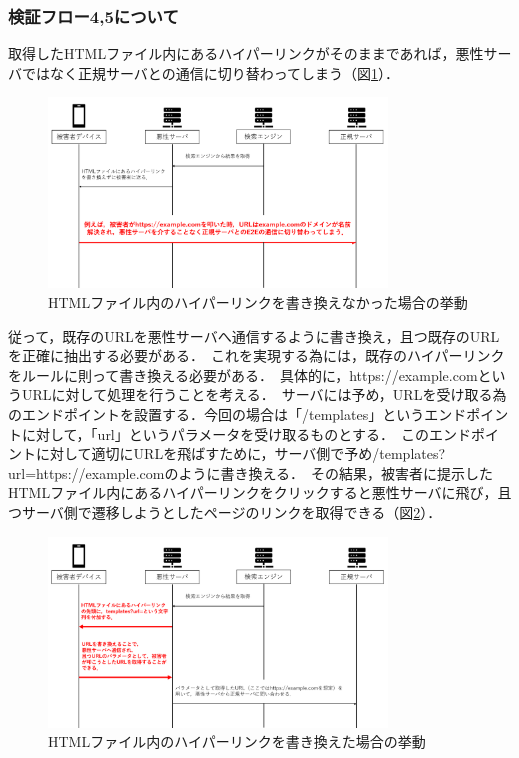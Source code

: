 \documentclass[dvipdfmx,twocolumn,9pt]{jsarticle}
\begin{document}
            \subsubsection{検証フロー4,5について}
                取得したHTMLファイル内にあるハイパーリンクがそのままであれば，悪性サーバではなく正規サーバとの通信に切り替わってしまう（図\ref{flow-no45-00}）．\
                \begin{figure}[h]
                    \centering
                    \includegraphics[width=9cm]{img/vc-vf-4-5-00.png}
                    \caption{HTMLファイル内のハイパーリンクを書き換えなかった場合の挙動}
                    \label{flow-no45-00}
                \end{figure}
                従って，既存のURLを悪性サーバへ通信するように書き換え，且つ既存のURLを正確に抽出する必要がある．\
                これを実現する為には，既存のハイパーリンクをルールに則って書き換える必要がある．\
                具体的に，https://example.comというURLに対して処理を行うことを考える．\
                サーバには予め，URLを受け取る為のエンドポイントを設置する．今回の場合は「/templates」というエンドポイントに対して，「url」というパラメータを受け取るものとする．\
                このエンドポイントに対して適切にURLを飛ばすために，サーバ側で予め/templates?url=https://example.comのように書き換える．\
                その結果，被害者に提示したHTMLファイル内にあるハイパーリンクをクリックすると悪性サーバに飛び，且つサーバ側で遷移しようとしたページのリンクを取得できる（図\ref{flow-no45-01}）．
                \begin{figure}[h]
                    \centering
                    \includegraphics[width=9cm]{img/vc-vf-4-5-01.png}
                    \caption{HTMLファイル内のハイパーリンクを書き換えた場合の挙動}
                    \label{flow-no45-01}
                \end{figure}
\end{document}

